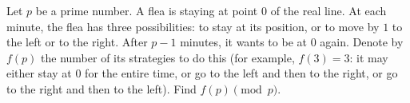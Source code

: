Let \(p\) be a prime number. A flea is staying at point \(0\) of the real line. At each minute, the flea has three possibilities: to stay at its position, or to move by \(1\) to the left or to the right. After \(p-1\) minutes, it wants to be at \(0\) again. Denote by \(f(p)\) the number of its strategies to do this (for example, \(f(3)=3\): it may either stay at \(0\) for the entire time, or go to the left and then to the right, or go to the right and then to the left). Find \(f(p)\pmod p\).

